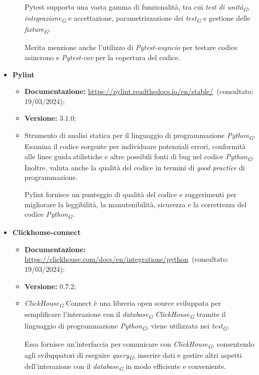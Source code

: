 \begin{itemize}
\begin{itemize}
        Pytest supporta una vasta gamma di funzionalità, tra cui \textit{test di unità}\textsubscript{\textit{G}}, \textit{integrazione}\textsubscript{\textit{G}} e accettazione, parametrizzazione dei \textit{test}\textsubscript{\textit{G}} e gestione delle \textit{fixture}\textsubscript{\textit{G}}.

        Merita menzione anche l'utilizzo di \textit{Pytest-asyncio} per testare codice asincrono e \textit{Pytest-cov} per la copertura del codice.
    \end{itemize}
    
    \item \textbf{Pylint}
    \begin{itemize}
        \item \textbf{Documentazione:} \url{https://pylint.readthedocs.io/en/stable/}~(consultato: 19/03/2024);
        \item \textbf{Versione:} 3.1.0;
        \item Strumento di analisi statica per il linguaggio di programmazione \textit{Python}\textsubscript{\textit{G}}. Esamina il codice sorgente per individuare potenziali errori, conformità alle linee guida stilistiche e altre possibili fonti di bug nel codice \textit{Python}\textsubscript{\textit{G}}. Inoltre, valuta anche la qualità del codice in termini di \textit{good practice} di programmazione.
        
        Pylint fornisce un punteggio di qualità del codice e suggerimenti per migliorare la leggibilità, la manutenibilità, sicurezza e la correttezza del codice \textit{Python}\textsubscript{\textit{G}}.
    \end{itemize}
    
    \item \textbf{Clickhouse-connect}
    \begin{itemize}
        \item \textbf{Documentazione:} \url{https://clickhouse.com/docs/en/integrations/python}~(consultato: 19/03/2024);
        \item \textbf{Versione:} 0.7.2;
        \item \textit{ClickHouse}\textsubscript{\textit{G}} Connect è una libreria open source sviluppata per semplificare l'interazione con il \textit{database}\textsubscript{\textit{G}} \textit{ClickHouse}\textsubscript{\textit{G}} tramite il linguaggio di programmazione \textit{Python}\textsubscript{\textit{G}}, viene utilizzata nei \textit{test}\textsubscript{\textit{G}}.
        
        Essa fornisce un'interfaccia per comunicare con \textit{ClickHouse}\textsubscript{\textit{G}}, consentendo agli sviluppatori di eseguire \textit{query}\textsubscript{\textit{G}}, inserire dati e gestire altri aspetti dell'interazione con il \textit{database}\textsubscript{\textit{G}} in modo efficiente e conveniente.
    \end{itemize}
\end{itemize}
